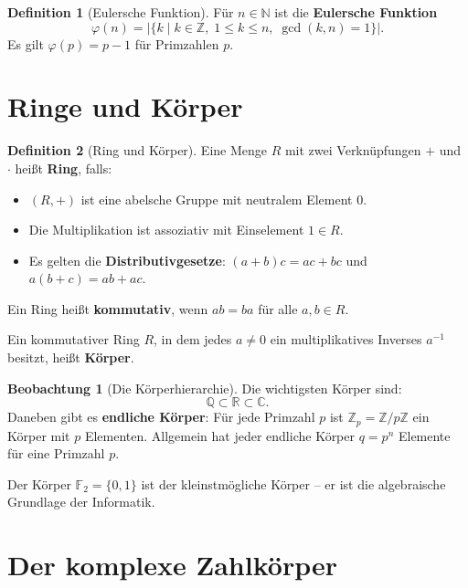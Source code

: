 ﻿\documentclass[a4paper,12pt]{report}
\theoremstyle{definition}
\newtheorem{definition}{Definition}
\newtheorem{beobachtung}{Beobachtung}
\begin{document}
\begin{definition}[Eulersche Funktion]
    Für $n \in \mathbb{N}$ ist die \textbf{Eulersche Funktion}
    \[
        \varphi(n) = |\{k \mid k \in \mathbb{Z},\; 1 \le k \le n,\; \gcd(k, n) = 1\}|.
    \]
    Es gilt $\varphi(p) = p - 1$ für Primzahlen $p$.
\end{definition}

\section{Ringe und Körper}

\begin{definition}[Ring und Körper]
    Eine Menge $R$ mit zwei Verknüpfungen $+$ und $\cdot$ heißt \textbf{Ring},
    falls:
    \begin{itemize}
        \item[-] $(R, +)$ ist eine abelsche Gruppe mit neutralem Element $0$.
        \item[-] Die Multiplikation ist assoziativ mit Einselement $1 \in R$.
        \item[-] Es gelten die \textbf{Distributivgesetze}:
              $(a + b)c = ac + bc$ und $a(b + c) = ab + ac$.
    \end{itemize}
    Ein Ring heißt \textbf{kommutativ}, wenn $ab = ba$ für alle $a, b \in R$.

    Ein kommutativer Ring $R$, in dem jedes $a \neq 0$ ein multiplikatives
    Inverses $a^{-1}$ besitzt, heißt \textbf{Körper}.
\end{definition}

\begin{beobachtung}[Die Körperhierarchie]
    Die wichtigsten Körper sind:
    \[
        \mathbb{Q} \subset \mathbb{R} \subset \mathbb{C}.
    \]
    Daneben gibt es \textbf{endliche Körper}: Für jede Primzahl $p$ ist
    $\mathbb{Z}_p = \mathbb{Z}/p\mathbb{Z}$ ein Körper mit $p$ Elementen. Allgemein
    hat jeder endliche Körper $q = p^n$ Elemente für eine Primzahl $p$.

    Der Körper $\mathbb{F}_2 = \{0, 1\}$ ist der kleinstmögliche Körper -- er
    ist die algebraische Grundlage der Informatik.
\end{beobachtung}

\section{Der komplexe Zahlkörper}
\end{document}
